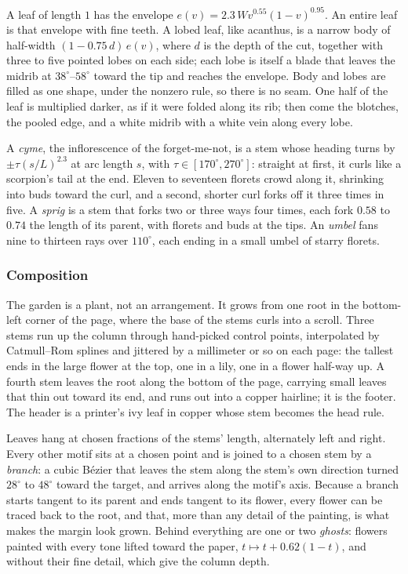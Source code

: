 \begin{construction}[Leaves]
A leaf of length $1$ has the envelope $e(v)=2.3\,W v^{0.55}(1-v)^{0.95}$. An entire leaf is
that envelope with fine teeth. A lobed leaf, like acanthus, is a narrow body of half-width
$(1-0.75\,d)\,e(v)$, where $d$ is the depth of the cut, together with three to five pointed
lobes on each side; each lobe is itself a blade that leaves the midrib at
$38^\circ$--$58^\circ$ toward the tip and reaches the envelope. Body and lobes are filled as
one shape, under the nonzero rule, so there is no seam. One half of the leaf is multiplied
darker, as if it were folded along its rib; then come the blotches, the pooled edge, and a
white midrib with a white vein along every lobe.
\end{construction}

\begin{construction}[Sprays]
A \emph{cyme}, the inflorescence of the forget-me-not, is a stem whose heading turns by
$\pm\tau(s/L)^{2.3}$ at arc length $s$, with $\tau\in[170^\circ,270^\circ]$: straight at first,
it curls like a scorpion's tail at the end. Eleven to seventeen florets crowd along it,
shrinking into buds toward the curl, and a second, shorter curl forks off it three times in
five. A \emph{sprig} is a stem that forks two or three ways four times, each fork $0.58$ to
$0.74$ the length of its parent, with florets and buds at the tips. An \emph{umbel} fans nine
to thirteen rays over $110^\circ$, each ending in a small umbel of starry florets.
\end{construction}

\subsubsection{Composition}

The garden is a plant, not an arrangement. It grows from one root in the bottom-left
corner of the page, where the base of the stems curls into a scroll. Three stems run up the
column through hand-picked control points, interpolated by Catmull--Rom splines and jittered
by a millimeter or so on each page: the tallest ends in the large flower at the top, one in
a lily, one in a flower half-way up. A fourth stem leaves the root along the bottom of the
page, carrying small leaves that thin out toward its end, and runs out into a copper
hairline; it is the footer. The header is a printer's ivy leaf in copper whose stem becomes
the head rule.

Leaves hang at chosen fractions of the stems' length, alternately left and right. Every
other motif sits at a chosen point and is joined to a chosen stem by a \emph{branch}: a cubic
B\'ezier that leaves the stem along the stem's own direction turned $28^\circ$ to $48^\circ$
toward the target, and arrives along the motif's axis. Because a branch starts tangent to
its parent and ends tangent to its flower, every flower can be traced back to the root, and
that, more than any detail of the painting, is what makes the margin look grown. Behind
everything are one or two \emph{ghosts}: flowers painted with every tone lifted toward the
paper, $t\mapsto t+0.62(1-t)$, and without their fine detail, which give the column depth.

